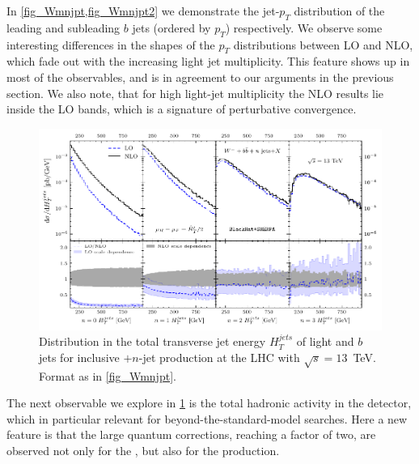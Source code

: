 In \cref{fig_Wmnjpt,fig_Wmnjpt2} we demonstrate the jet-$p_T$ distribution of the leading
and subleading $b$ jets (ordered by $p_T$) respectively. 
We observe some interesting differences in the shapes of the $p_T$ distributions between
LO and NLO, which fade out with the increasing light jet multiplicity.
This feature shows up in most of the observables, and is in agreement to our arguments in the previous section.
We also note, that for high light-jet multiplicity  the NLO results lie inside the LO bands,
which is a signature of perturbative convergence.

\begin{figure}[ht]
  \centering
  \includegraphics[clip,scale=1.0]{plots/htjets.pdf}
  \caption{Distribution in the total transverse jet energy
    $H_T^{jets}$ of light  and $b$ jets for inclusive \Wbbm$+n$-jet
    production at the LHC with $\sqrt{s}=13$~TeV. Format as in \cref{fig_Wmnjpt}.}
    \label{fig_Wmnjht}
  \end{figure}

The next observable we explore in \cref{fig_Wmnjht} is the total hadronic activity in the detector,
which in particular relevant for beyond-the-standard-model searches.
Here a new feature is that the large quantum corrections, reaching a factor of two, are observed not only for the \Wbb{}, but also for the  \Wbbj{} production. 

